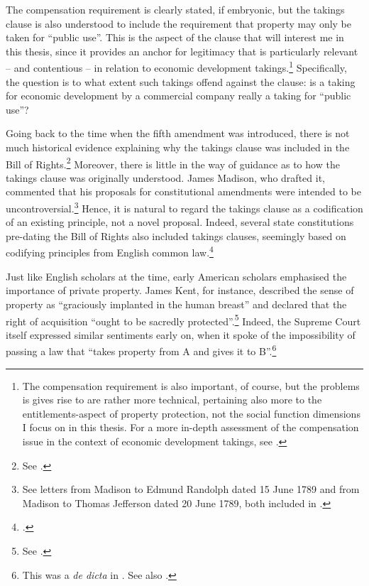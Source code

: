 The compensation requirement is clearly stated, if embryonic, but the takings clause is also understood to include the requirement that property may only be taken for ``public use''. This is the aspect of the clause that will interest me in this thesis, since it provides an anchor for legitimacy that is particularly relevant -- and contentious -- in relation to economic development takings.\footnote{The compensation requirement is also important, of course, but the problems is gives rise to are rather more technical, pertaining also more to the entitlements-aspect of property protection, not the social function dimensions I focus on in this thesis. For a more in-depth assessment of the compensation issue in the context of economic development takings, see \cite{dyrkolbotn15}.}
Specifically, the question is to what extent such takings offend against the clause: is a taking for economic development by a commercial company really a taking for ``public use''?

Going back to the time when the fifth amendment was introduced, there is not much historical evidence explaining why the takings clause was included in the Bill of Rights.\footnote{See \cite{fifth}.} Moreover, there is little in the way of guidance as to how the takings clause was originally understood. James Madison, who drafted it, commented that his proposals for constitutional amendments were intended to be uncontroversial.\footnote{See letters from Madison to Edmund Randolph dated 15 June 1789 and from Madison to Thomas Jefferson dated 20 June 1789, both included in \cite{madison79}.} Hence, it is natural to regard the takings clause as a codification of an existing principle, not a novel proposal. Indeed, several state constitutions pre-dating the Bill of Rights also included takings clauses, seemingly based on codifying principles from English common law.\footcite[See][299]{johnson11} 


Just like English scholars at the time, early American scholars emphasised the importance of private property. James Kent, for instance, described the sense of property as ``graciously implanted in the human breast'' and declared that the right of acquisition ``ought to be sacredly protected''.\footnote{See \cite[see][257]{kent27}.} Indeed, the Supreme Court itself expressed similar sentiments early on, when it spoke of the impossibility of passing a law that ``takes property from A and gives it to B''.\footnote{This was a {\it de dicta} in \cite[388]{calder98}. See also \cite[310]{vanhorne95}.}

